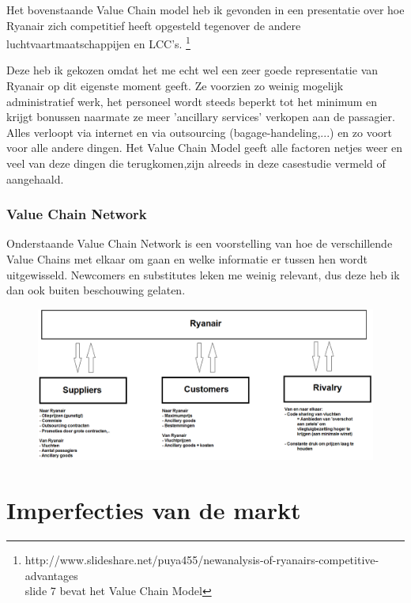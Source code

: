 \documentclass{article}
\begin{document}
Het bovenstaande Value Chain model heb ik gevonden in een presentatie over hoe Ryanair zich competitief heeft opgesteld tegenover de andere luchtvaartmaatschappijen en LCC's. \footnote{http://www.slideshare.net/puya455/newanalysis-of-ryanairs-competitive-advantages \\ slide 7 bevat het Value Chain Model}
\newpage

Deze heb ik gekozen omdat het me echt wel een zeer goede representatie van Ryanair op dit eigenste moment geeft. Ze voorzien zo weinig mogelijk administratief werk, het personeel wordt steeds beperkt tot het minimum en krijgt bonussen naarmate ze meer 'ancillary services' verkopen aan de passagier. Alles verloopt via internet en via outsourcing (bagage-handeling,...) en zo voort voor alle andere dingen.
Het Value Chain Model geeft alle factoren netjes weer en veel van deze dingen die terugkomen,zijn alreeds in deze casestudie vermeld of aangehaald.

\section{Value Chain Network}

Onderstaande Value Chain Network is een voorstelling van hoe de verschillende Value Chains met elkaar om gaan en welke informatie er tussen hen wordt uitgewisseld. Newcomers en substitutes leken me weinig relevant, dus deze heb ik dan ook buiten beschouwing gelaten.

\begin{figure}[h]
\centering
\includegraphics[scale=0.35]{image5}
\end{figure}

\newpage
\part{Imperfecties van de markt}
\setcounter{section}{0}
\end{document}

